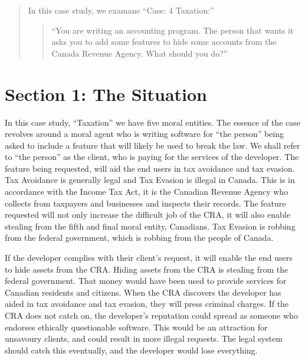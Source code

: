 \begin{abstract}
In this case study, we examane ``Case: 4 Taxation:'' 
\begin{quote}
``You are writing an accounting program. The person that wants it asks you to add some features 
to hide some accounts from the Canada Revenue Agency. What should you do?''
\end{quote}
\end{abstract}

\section{Section 1: The Situation}

In this case study, ``Taxation'' we have five moral entities. The essence of the case revolves around a moral agent who is writing software for ``the person'' being asked to include a feature that will likely be used to break the law. We shall refer to ``the person'' as the client, who is paying for the services of the developer. The feature being requested, will aid the end users in tax avoidance and tax evasion. Tax Avoidance is generally legal and Tax Evasion is illegal in Canada. This is in accordance with the Income Tax Act, it is the Canadian Revenue Agency who collects from  taxpayers and businesses and inspects their records. The feature requested will not only increase the difficult job of the CRA, it will also enable stealing from the fifth and final moral entity, Canadians. Tax Evasion is robbing from the federal government, which is robbing from the people of Canada.


If the developer complies with their client's request, it will enable the end users to hide assets from the CRA. Hiding assets from the CRA is stealing from the federal government. That money would have been used to provide services for Canadian residents and citizens. When the CRA discovers the developer has aided in tax avoidance and tax evasion, they will press criminal charges. If the CRA does not catch on, the developer’s reputation could spread as someone who endorses ethically questionable software. This would be an attraction for unsavoury clients, and could result in more illegal requests. The legal system should catch this eventually, and the developer would lose everything.  


